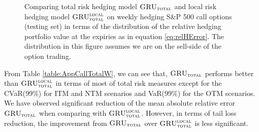 \documentclass[letterpaper,12pt,titlepage,oneside,final]{book}
\numberwithin{equation}{section}
\theoremstyle{definition}
\newcommand{\modelT}{\textsc{GRU}_{\textsc{total}}}
\newcommand{\modelL}{\textsc{GRU}_{\textsc{total}}^{\textsc{local}}}
\begin{document}
\begin{figure}[htp!]
	\centering
	\caption{Comparing total risk hedging model $\modelT$ and local risk hedging model $\modelL$ on weekly hedging S\&P 500 call options (testing set) in terms of the distribution of the  relative hedging portfolio value at the expiries as in equation \eqref{eq:relHError}. The distribution in this figure assumes we are on the sell-side of the option trading.} \label{fig:AppCallTotalW1}
\end{figure}

From Table \ref{table:AppCallTotalW}, we can see that, $\modelT$ performs better than $\modelL$ in terms of most of total risk measures except for the CVaR(99\%) for ITM and NTM scenarios and VaR(99\%) for the OTM scenarios. We have observed significant reduction of the mean absolute relative error $\modelT$ when comparing with $\modelL$. However, in terms of tail loss reduction, the improvement from $\modelT$ over   $\modelL$ is less significant.
\end{document}
